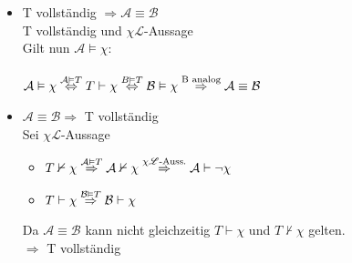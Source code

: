 \documentclass[a4paper]{scrartcl}
\begin{document}
    \begin{itemize}
        \item T vollständig $\Rightarrow \mathcal{A} \equiv \mathcal{B}$\\
            T vollständig und $\chi \mathscr{L}$-Aussage\\
            Gilt nun $\mathcal{A} \vDash \chi$:\\
            \\$\mathcal{A} \vDash \chi\\
            \overset{\mathcal{A}\vDash T}{\Leftrightarrow} T \vdash \chi\\
            \overset{B \vDash T}{\Leftrightarrow}\mathcal{B} \vDash \chi\\
            \overset{\text{B analog}}{\Rightarrow} \mathcal{A} \equiv \mathcal{B}$\\
        
        \item $\mathcal{A} \equiv \mathcal{B} \Rightarrow$ T vollständig\\
            Sei $\chi \mathscr{L}$-Aussage\\
            \begin{itemize}
                \item $T \nvdash \chi\\
                    \overset{\mathcal{A} \vDash T}{\Rightarrow} \mathcal{A} \nvdash \chi\\
                    \overset{\chi \mathscr{L}\text{-Auss.}}{\Rightarrow} \mathcal{A} \vdash \neg \chi$\\

                \item $T \vdash \chi\\
                    \overset{\mathcal{B} \vDash T}{\Rightarrow} \mathcal{B} \vdash \chi$\\
            \end{itemize}

            Da $\mathcal{A} \equiv \mathcal{B}$ kann nicht gleichzeitig $T \vdash \chi$ und $T \nvdash \chi$ gelten.\\
            $\Rightarrow$ T vollständig\\

    \end{itemize}

\section*{}%
\label{sec:aufgabe_2}
\end{document}
